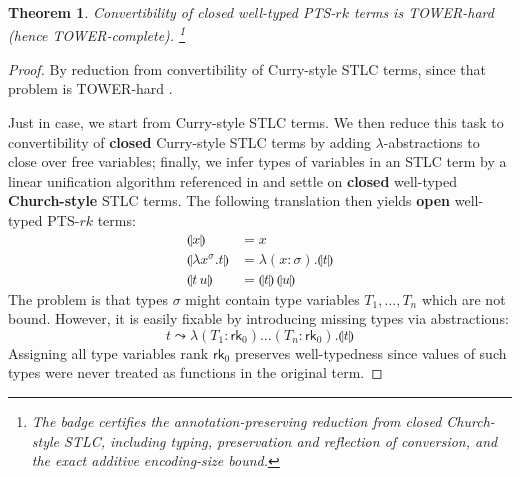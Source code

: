 \documentclass{article}
\newtheorem{theorem}{Theorem}
\theoremstyle{definition}
\theoremstyle{remark}
\begin{document}
\begin{theorem}
    Convertibility of closed well-typed PTS-$rk$ terms
    is \textsc{TOWER}-hard (hence
    \textsc{TOWER}-complete).
    \footnote{The badge certifies the
    annotation-preserving reduction from closed
    Church-style STLC, including typing, preservation
    and reflection of conversion, and the exact
    additive encoding-size bound.}
\end{theorem}
\begin{proof}
    By reduction from convertibility of Curry-style
    STLC terms, since that problem is
    \textsc{TOWER}-hard \cite{nguyen2024simply}.

    Just in case, we start from Curry-style STLC terms.
    We then reduce this task to convertibility of
    \textbf{closed} Curry-style STLC terms by adding
    $\lambda$-abstractions to close over free
    variables; finally, we infer types of variables in
    an STLC term by a linear unification algorithm
    referenced in \cite{nguyen2024simply} and settle on
    \textbf{closed} well-typed \textbf{Church-style}
    STLC terms. The following translation then yields
    \textbf{open} well-typed PTS-$rk$ terms:
    \begin{align*}
        \llparenthesis x \rrparenthesis &= x \\
        \llparenthesis \lambda x^\sigma.t
        \rrparenthesis &= \lambda(x:\sigma).
            \llparenthesis t \rrparenthesis \\
        \llparenthesis t\,u \rrparenthesis &=
        \llparenthesis t \rrparenthesis \,
        \llparenthesis u \rrparenthesis
    \end{align*}
    The problem is that types $\sigma$ might contain
    type variables $T_1,\ldots,T_n$ which are not
    bound. However, it is easily fixable by introducing
    missing types via abstractions:
    \[ t \leadsto \lambda(T_1:\mathsf{rk}_0)\ldots
    (T_n:\mathsf{rk}_0).\llparenthesis t \rrparenthesis
    \]
    Assigning all type variables rank $\mathsf{rk}_0$
    preserves well-typedness since values of such types
    were never treated as functions in the original
    term.
\end{proof}
\end{document}
